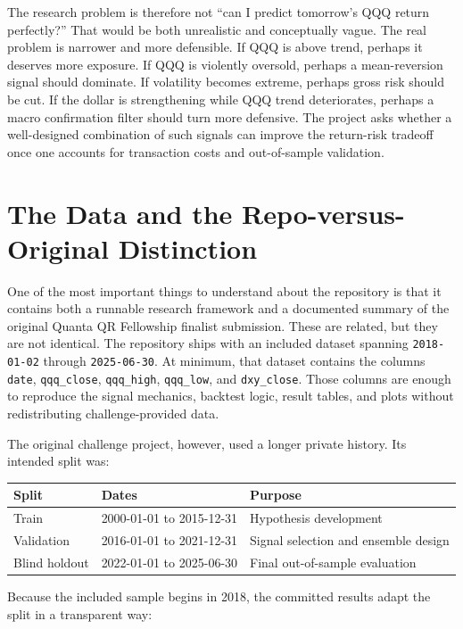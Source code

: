 \documentclass[11pt]{article}
\begin{document}
The research problem is therefore not ``can I predict tomorrow's QQQ return
perfectly?'' That would be both unrealistic and conceptually vague. The real
problem is narrower and more defensible. If QQQ is above trend, perhaps it
deserves more exposure. If QQQ is violently oversold, perhaps a mean-reversion
signal should dominate. If volatility becomes extreme, perhaps gross risk should
be cut. If the dollar is strengthening while QQQ trend deteriorates, perhaps a
macro confirmation filter should turn more defensive. The project asks whether a
well-designed combination of such signals can improve the return-risk tradeoff
once one accounts for transaction costs and out-of-sample validation.

\section*{The Data and the Repo-versus-Original Distinction}

One of the most important things to understand about the repository is that it
contains both a runnable research framework and a documented summary of the
original Quanta QR Fellowship finalist submission. These are related, but they
are not identical. The repository ships with an included dataset spanning
\texttt{2018-01-02} through \texttt{2025-06-30}. At minimum,
that dataset contains the columns \texttt{date}, \texttt{qqq\_close},
\texttt{qqq\_high}, \texttt{qqq\_low}, and \texttt{dxy\_close}. Those columns
are enough to reproduce the signal mechanics, backtest logic, result tables, and
plots without redistributing challenge-provided data.

The original challenge project, however, used a longer private history. Its
intended split was:

\begin{center}
\begin{tabular}{lll}
\toprule
\textbf{Split} & \textbf{Dates} & \textbf{Purpose} \\
\midrule
Train & 2000-01-01 to 2015-12-31 & Hypothesis development \\
Validation & 2016-01-01 to 2021-12-31 & Signal selection and ensemble design \\
Blind holdout & 2022-01-01 to 2025-06-30 & Final out-of-sample evaluation \\
\bottomrule
\end{tabular}
\end{center}

Because the included sample begins in 2018, the committed results adapt the
split in a transparent way:
\end{document}
